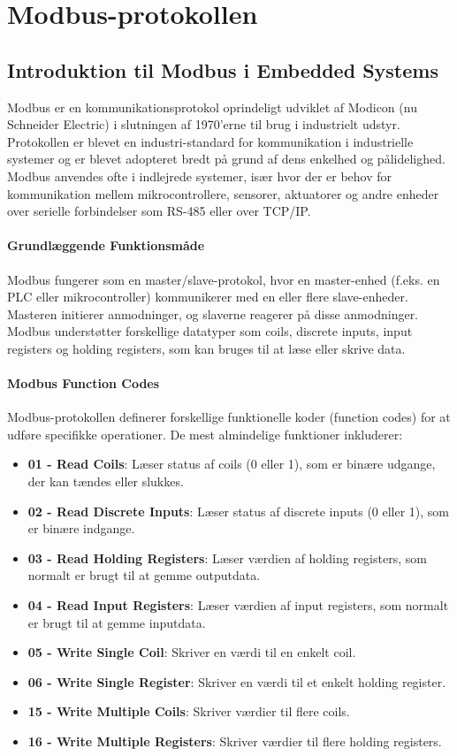 \documentclass[12pt,a4paper]{book}
\begin{document}
	\section{Modbus-protokollen}
	
	\subsection{Introduktion til Modbus i Embedded Systems}
	Modbus er en kommunikationsprotokol oprindeligt udviklet af Modicon (nu Schneider Electric) i slutningen af 1970'erne til brug i industrielt udstyr. Protokollen er blevet en industri-standard for kommunikation i industrielle systemer og er blevet adopteret bredt på grund af dens enkelhed og pålidelighed. Modbus anvendes ofte i indlejrede systemer, især hvor der er behov for kommunikation mellem mikrocontrollere, sensorer, aktuatorer og andre enheder over serielle forbindelser som RS-485 eller over TCP/IP.
	
	\paragraph{Grundlæggende Funktionsmåde}
	Modbus fungerer som en master/slave-protokol, hvor en master-enhed (f.eks. en PLC eller mikrocontroller) kommunikerer med en eller flere slave-enheder. Masteren initierer anmodninger, og slaverne reagerer på disse anmodninger. Modbus understøtter forskellige datatyper som coils, discrete inputs, input registers og holding registers, som kan bruges til at læse eller skrive data.
	
	\paragraph{Modbus Function Codes}
	Modbus-protokollen definerer forskellige funktionelle koder (function codes) for at udføre specifikke operationer. De mest almindelige funktioner inkluderer:
	\begin{itemize}
		\item \textbf{01 - Read Coils}: Læser status af coils (0 eller 1), som er binære udgange, der kan tændes eller slukkes.
		\item \textbf{02 - Read Discrete Inputs}: Læser status af discrete inputs (0 eller 1), som er binære indgange.
		\item \textbf{03 - Read Holding Registers}: Læser værdien af holding registers, som normalt er brugt til at gemme outputdata.
		\item \textbf{04 - Read Input Registers}: Læser værdien af input registers, som normalt er brugt til at gemme inputdata.
		\item \textbf{05 - Write Single Coil}: Skriver en værdi til en enkelt coil.
		\item \textbf{06 - Write Single Register}: Skriver en værdi til et enkelt holding register.
		\item \textbf{15 - Write Multiple Coils}: Skriver værdier til flere coils.
		\item \textbf{16 - Write Multiple Registers}: Skriver værdier til flere holding registers.
	\end{itemize}
	
\end{document}
